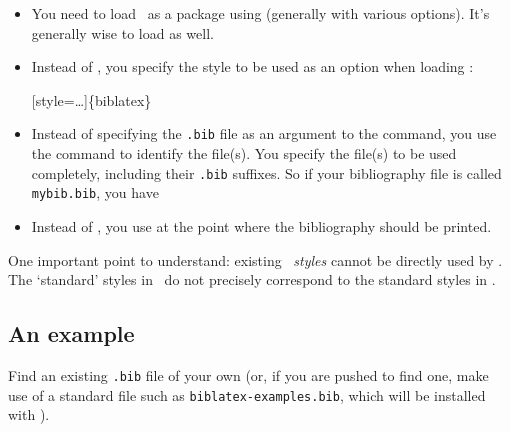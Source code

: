 \begin{itemize}
\item You need to load \biblatex\ as a package using 
  (generally with various options). It's generally wise to load
   as well.
\item Instead of , you specify the style to be
  used as an option when loading \biblatex:
\begin{pseudoverb}\centering
  [style=\ldots]\{biblatex\}
\end{pseudoverb}
\item Instead of specifying the \verb|.bib| file as an argument to the
   command, you use the command
   to identify the file(s). You specify the
  file(s) to be used completely, including their \verb|.bib|
  suffixes. So if your bibliography file is called \verb|mybib.bib|,
  you have
\begin{pseudoverb}
  \centering {}
\end{pseudoverb}
\item Instead of , you use  at
  the point where the bibliography should be printed.
\end{itemize}

One important point to understand: existing \bibtex\ \emph{styles}
cannot be directly used by \biblatex.  The `standard' styles in \biblatex\
do not precisely correspond to the standard styles in \bibtex.

\subsection{An example}

Find an existing \verb|.bib| file of your own (or, if you are pushed
to find one, make use of a standard file such as
\verb|biblatex-examples.bib|, which will be installed with \biblatex).




